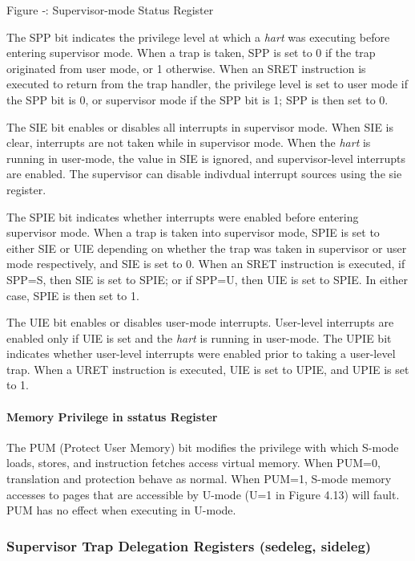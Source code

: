 \missingfigure{}

\protect\hypertarget{_Ref367096223}{}{}Figure ‑: Supervisor-mode Status
Register

The SPP bit indicates the privilege level at which a \emph{hart} was
executing before entering supervisor mode. When a trap is taken, SPP is
set to 0 if the trap originated from user mode, or 1 otherwise. When an
SRET instruction is executed to return from the trap handler, the
privilege level is set to user mode if the SPP bit is 0, or supervisor
mode if the SPP bit is 1; SPP is then set to 0.

The SIE bit enables or disables all interrupts in supervisor mode. When
SIE is clear, interrupts are not taken while in supervisor mode. When
the \emph{hart} is running in user-mode, the value in SIE is ignored,
and supervisor-level interrupts are enabled. The supervisor can disable
indivdual interrupt sources using the sie register.

The SPIE bit indicates whether interrupts were enabled before entering
supervisor mode. When a trap is taken into supervisor mode, SPIE is set
to either SIE or UIE depending on whether the trap was taken in
supervisor or user mode respectively, and SIE is set to 0. When an SRET
instruction is executed, if SPP=S, then SIE is set to SPIE; or if SPP=U,
then UIE is set to SPIE. In either case, SPIE is then set to 1.

The UIE bit enables or disables user-mode interrupts. User-level
interrupts are enabled only if UIE is set and the \emph{hart} is running
in user-mode. The UPIE bit indicates whether user-level interrupts were
enabled prior to taking a user-level trap. When a URET instruction is
executed, UIE is set to UPIE, and UPIE is set to 1.

\paragraph{Memory Privilege in sstatus Register
}\label{memory-privilege-in-sstatus-register}

The PUM (Protect User Memory) bit modifies the privilege with which
S-mode loads, stores, and instruction fetches access virtual memory.
When PUM=0, translation and protection behave as normal. When PUM=1,
S-mode memory accesses to pages that are accessible by U-mode (U=1 in
Figure 4.13) will fault. PUM has no effect when executing in U-mode.

\subsubsection{Supervisor Trap Delegation Registers (sedeleg,
sideleg)}\label{supervisor-trap-delegation-registers-sedeleg-sideleg}

